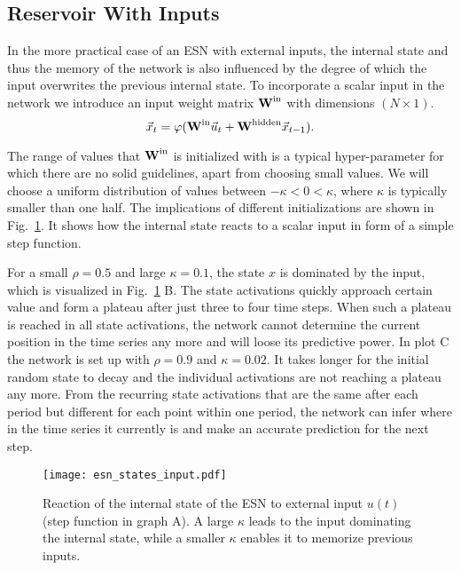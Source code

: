 \subsection{Reservoir With Inputs}
\label{sub:reservoir_without_feedback_weights}

In the more practical case of an ESN with external inputs, the internal state
and thus the memory of the network is also influenced by the degree of which
the input overwrites the previous internal state.  To incorporate a scalar
input in the network we introduce an input weight matrix $\boldsymbol{\textbf{W}}^{\text{in}}$ with
dimensions $(N \times 1)$.
\begin{equation}
  \label{eq:state_space_no_feedback}
  \vec{x}_t = \varphi(\boldsymbol{\textbf{W}}^{\text{in}}  \vec{u}_t + \boldsymbol{\textbf{W}}^{\text{hidden}} \vec{x}_{t-1}).
\end{equation}

The range of values that $\boldsymbol{\textbf{W}}^{\text{in}}$ is initialized with is a typical
hyper-parameter for which there are no solid guidelines, apart from choosing
small values.  We will choose a uniform distribution of values between $-\kappa
< 0 < \kappa$, where $\kappa$ is typically smaller than one half. The
implications of different initializations are shown in
Fig.~\ref{fig:esn_states_input}.  It shows how the internal state reacts to a
scalar input in form of a simple step function. 

For a small $\rho=0.5$ and large $\kappa=0.1$, the state $x$ is dominated by
the input, which is visualized in Fig.~\ref{fig:esn_states_input} B.  The state
activations quickly approach certain value and form a plateau after just three
to four time steps. When such a plateau is reached in all state activations,
the network cannot determine the current position in the time series any more
and will loose its predictive power.  In plot C the network is set up with
$\rho=0.9$ and $\kappa=0.02$.  It takes longer for the initial random state to
decay and the individual activations are not reaching a plateau any more.  From
the recurring state activations that are the same after each period but
different for each point within one period, the network can infer where in the
time series it currently is and make an accurate prediction for the next step.
\begin{figure}
  \centering
  \texttt{[image: esn\_states\_input.pdf]}
  \caption{Reaction of the internal state of the ESN to external input $u(t)$
  (step function in graph A).
  A large $\kappa$ leads to the input dominating the internal state, while a
  smaller $\kappa$ enables it to memorize previous inputs.}
  \label{fig:esn_states_input}
\end{figure}

